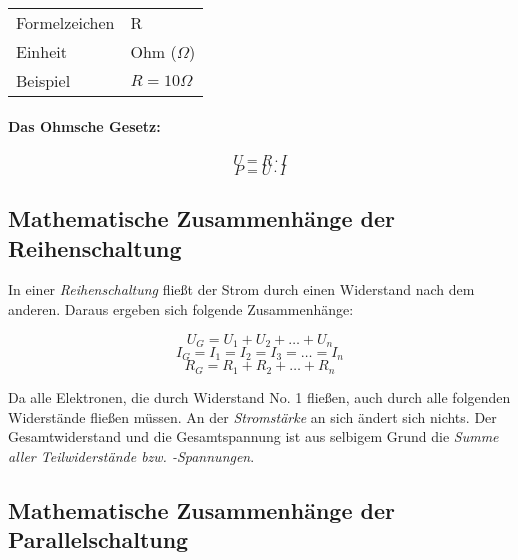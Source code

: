 \documentclass[a4paper, 12pt]{report}
\begin{document}
\begin{center}
    \begin{tabular}{ ll }
		Formelzeichen & R            \\
		Einheit       & Ohm ($\Omega$)   \\
		Beispiel      & $R = 10\Omega$    \\
	\end{tabular}
\end{center}

\paragraph{Das Ohmsche Gesetz:}

\begin{center}
    \begin{equation}
	U = R \cdot I
    \end{equation}
    \begin{equation}
	P = U \cdot I
    \end{equation}
\end{center}

\subsection{Mathematische Zusammenhänge der Reihenschaltung}

In einer \emph{Reihenschaltung} fließt der Strom durch einen Widerstand nach
dem anderen. Daraus ergeben sich folgende Zusammenhänge:

\begin{center}
    \begin{equation}
	U_G = U_1 + U_2 + \dots + U_n
    \end{equation}
    \begin{equation}
	I_G = I_1 = I_2 = I_3 = \dots = I_n
    \end{equation}
    \begin{equation}
	R_G = R_1 + R_2 + \dots + R_n
    \end{equation}
\end{center}

Da alle Elektronen, die durch Widerstand No. 1 fließen, auch durch alle
folgenden Widerstände fließen müssen. An der \emph{Stromstärke} an sich ändert
sich nichts. Der Gesamtwiderstand und die Gesamtspannung ist aus selbigem Grund
die \emph{Summe aller Teilwiderstände bzw. -Spannungen}.

\subsection{Mathematische Zusammenhänge der Parallelschaltung}
\end{document}
